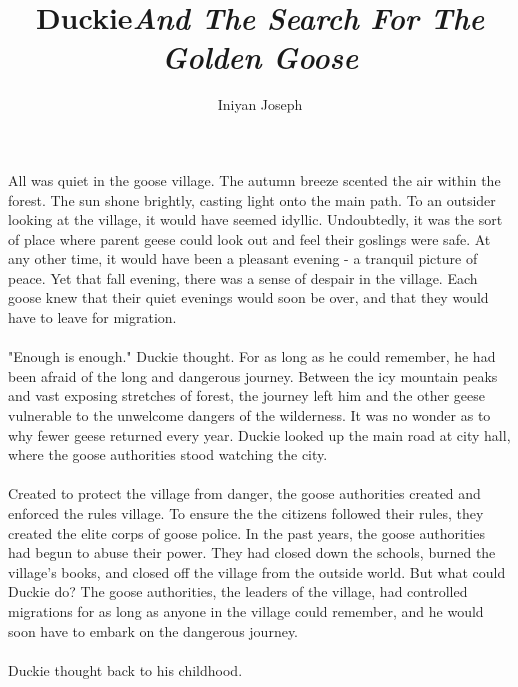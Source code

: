 \documentclass[a4paper,10pt,standalone]{book}
\title{\textbf{Duckie}\linebreak \textit{And The Search For The Golden Goose}}
\date{}
\author{Iniyan Joseph}
\begin{document}
\maketitle


\tableofcontents
\vfill
\pagebreak
\paragraph{} All was quiet in the goose village. The autumn breeze scented the air within the forest. The sun shone brightly, casting light onto the main path. To an outsider looking at the village, it would have seemed idyllic. Undoubtedly, it was the sort of place where parent geese could look out and feel their goslings were safe. At any other time, it would have been a pleasant evening - a tranquil picture of peace. Yet that fall evening, there was a sense of despair in the village. Each goose knew that their quiet evenings would soon be over, and that they would have to leave for migration. 
\paragraph{} "Enough is enough." Duckie thought. For as long as he could remember, he had been afraid of the long and dangerous journey. Between the icy mountain peaks and vast exposing stretches of forest, the journey left him and the other geese vulnerable to the unwelcome dangers of the wilderness. It was no wonder as to why fewer geese returned every year. Duckie looked up the main road at city hall, where the goose authorities stood watching the city. 
\paragraph{} Created to protect the village from danger, the goose authorities created and enforced the rules village. To ensure the the citizens followed their rules, they created the elite corps of goose police. In the past years, the goose authorities had begun to abuse their power. They had closed down the schools, burned the village's books, and closed off the village from the outside world. But what could Duckie do? The goose authorities, the leaders of the village, had controlled migrations for as long as anyone in the village could remember, and he would soon have to embark on the dangerous journey.
\paragraph{} Duckie thought back to his childhood. 
\end{document}
